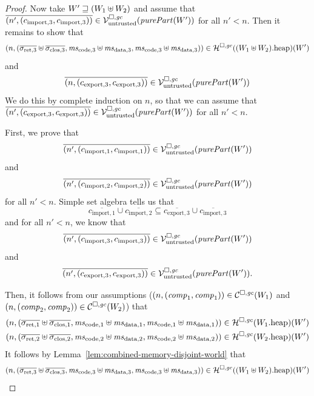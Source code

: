 \documentclass[a4paper]{article}
\begin{document}
\begin{proof}
  Now take $W' \sqsupseteq (W_1\uplus W_2)$ and assume that $\overline{\npair[n']{(c_{\mathrm{import},3},c_{\mathrm{import},3})}} \in \lrv(\purePart{W'})$ for all $n' < n$.
  Then it remains to show that
  \begin{equation*}
    \npair{(\sigrets[3]\uplus\sigcloss[3],\mscode[3]\uplus \msdata[3], \mscode[3]\uplus\msdata[3])} \in \lrheap(\pwheap[(W_1\uplus W_2)])(W')
  \end{equation*}
  and
  \begin{equation*}
    \overline{\npair{(c_{\mathrm{export},3},c_{\mathrm{export},3})}} \in \lrv(\purePart{W'})
  \end{equation*}
  We do this by complete induction on $n$, so that we can assume that $\overline{\npair[n']{(c_{\mathrm{export},3},c_{\mathrm{export},3})}} \in \lrv(\purePart{W'})$ for all $n' < n$.

  First, we prove that
  \begin{equation*}
    \overline{\npair[n']{(c_{\mathrm{import},1},c_{\mathrm{import},1})}} \in \lrv(\purePart{W'})
  \end{equation*}
  and
  \begin{equation*}
    \overline{\npair[n']{(c_{\mathrm{import},2},c_{\mathrm{import},2})}} \in \lrv(\purePart{W'})
  \end{equation*}
  for all $n' < n$.
  Simple set algebra tells us that 
  \begin{equation*}
    \overline{c_{\mathrm{import},1}} \cup \overline{c_{\mathrm{import},2}} \subseteq \overline{c_{\mathrm{export},3}} \cup \overline{c_{\mathrm{import},3}}
  \end{equation*}
  and for all $n' < n$, we know that
  \begin{equation*}
    \overline{\npair[n']{(c_{\mathrm{import},3},c_{\mathrm{import},3})}} \in \lrv(\purePart{W'})
  \end{equation*}
  and
  \begin{equation*}
    \overline{\npair[n']{(c_{\mathrm{export},3},c_{\mathrm{export},3})}} \in \lrv(\purePart{W'})\text{.}
  \end{equation*}
  
  Then, it follows from our assumptions ($\left(n,(\mathit{comp}_1,\mathit{comp}_1)\right) \in \mathcal{C}^{\square,\mathit{gc}}(W_1)$ and $\left(n,(\mathit{comp}_2,\mathit{comp}_2)\right) \in \mathcal{C}^{\square,\mathit{gc}}(W_2)$) that
  \begin{align*}
    \npair{(\sigrets[1]\uplus\sigcloss[1],\mscode[1]\uplus \msdata[1], \mscode[1]\uplus\msdata[1])} &\in \lrheap(\pwheap[W_1])(W')\\
    \npair{(\sigrets[2]\uplus\sigcloss[2],\mscode[2]\uplus \msdata[2], \mscode[2]\uplus\msdata[2])} &\in \lrheap(\pwheap[W_2])(W')
  \end{align*}
  It follows by Lemma~\ref{lem:combined-memory-disjoint-world} that 
  \begin{equation*}
    \npair{(\sigrets[3]\uplus\sigcloss[3],\mscode[3]\uplus \msdata[3], \mscode[3]\uplus\msdata[3])} \in \lrheap(\pwheap[(W_1\uplus W_2)])(W')
  \end{equation*}
  

\end{proof}
\end{document}

